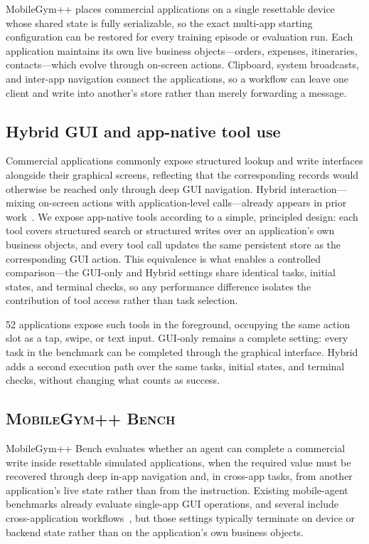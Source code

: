 MobileGym++ places commercial applications on a single resettable device whose shared state is fully serializable, so the exact multi-app starting configuration can be restored for every training episode or evaluation run. Each application maintains its own live business objects---orders, expenses, itineraries, contacts---which evolve through on-screen actions. Clipboard, system broadcasts, and inter-app navigation connect the applications, so a workflow can leave one client and write into another's store rather than merely forwarding a message.

\subsection{Hybrid GUI and app-native tool use}
\label{sec:mgpp-tools}

Commercial applications commonly expose structured lookup and write interfaces alongside their graphical screens, reflecting that the corresponding records would otherwise be reached only through deep GUI navigation. Hybrid interaction---mixing on-screen actions with application-level calls---already appears in prior work~\citep{kong2026mobileworld}. We expose app-native tools according to a simple, principled design: each tool covers structured search or structured writes over an application's own business objects, and every tool call updates the same persistent store as the corresponding GUI action. This equivalence is what enables a controlled comparison---the GUI-only and Hybrid settings share identical tasks, initial states, and terminal checks, so any performance difference isolates the contribution of tool access rather than task selection.

52 applications expose such tools in the foreground, occupying the same action slot as a tap, swipe, or text input. GUI-only remains a complete setting: every task in the benchmark can be completed through the graphical interface. Hybrid adds a second execution path over the same tasks, initial states, and terminal checks, without changing what counts as success.

\subsection{\textsc{MobileGym++ Bench}}
\label{sec:mgpp-bench}

MobileGym++ Bench evaluates whether an agent can complete a commercial write inside resettable simulated applications, when the required value must be recovered through deep in-app navigation and, in cross-app tasks, from another application's live state rather than from the instruction. Existing mobile-agent benchmarks already evaluate single-app GUI operations, and several include cross-application workflows~\citep{rawles2025androidworld,kong2026mobileworld}, but those settings typically terminate on device or backend state rather than on the application's own business objects.

